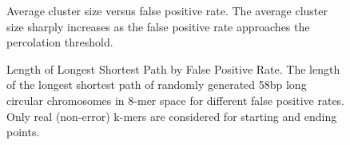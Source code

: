 \documentclass{pnastwo}
\begin{document}
\begin{figure}
\caption{Average cluster size versus false positive rate. The average 
cluster size sharply increases as the false positive 
rate approaches the percolation threshold.
}
\label{fig:clustersize}
\end{figure}

\begin{figure}

\caption{Length of Longest Shortest Path by False Positive Rate. The
  length of the longest shortest path of randomly generated 58bp long
  circular chromosomes in 8-mer space for different false positive
  rates. Only real (non-error) k-mers are considered for starting and
  ending points.}
\label{fig:diam}
\end{figure}
\end{document}
